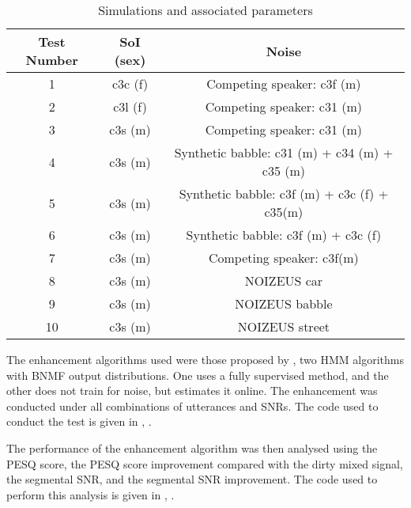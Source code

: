 \begin{table}
\protect\caption{\label{tab:test-params}Simulations and associated parameters}


\begin{centering}
\begin{tabular}{|c|c|c|}
\hline 
Test Number & \ac{SoI} (sex) & Noise\tabularnewline
\hline 
\hline 
1 & c3c (f) & Competing speaker: c3f (m)\tabularnewline
\hline 
2 & c3l (f) & Competing speaker: c31 (m)\tabularnewline
\hline 
3 & c3s (m) & Competing speaker: c31 (m)\tabularnewline
\hline 
4 & c3s (m) & Synthetic babble: c31 (m) + c34 (m) + c35 (m)\tabularnewline
\hline 
5 & c3s (m) & Synthetic babble: c3f (m) + c3c (f) + c35(m)\tabularnewline
\hline 
6 & c3s (m) & Synthetic babble: c3f (m) + c3c (f)\tabularnewline
\hline 
7 & c3s (m) & Competing speaker: c3f(m)\tabularnewline
\hline 
8 & c3s (m) & NOIZEUS car\tabularnewline
\hline 
9 & c3s (m) & NOIZEUS babble\tabularnewline
\hline 
10 & c3s (m) & NOIZEUS street\tabularnewline
\hline 
\end{tabular}
\par\end{centering}

%
%
\end{table}


The enhancement algorithms used were those proposed by \citet{mohammadiha2013supervised},
two \ac{HMM} algorithms with \ac{BNMF} output distributions. One
uses a fully supervised method, and the other does not train for noise,
but estimates it online. The enhancement was conducted under all combinations
of utterances and \acp{SNR}. The code used to conduct the test is
given in , \textit{}.

The performance of the enhancement algorithm was then analysed using
the \ac{PESQ} score, the \ac{PESQ} score improvement compared with
the dirty mixed signal, the segmental \ac{SNR}, and the segmental
\ac{SNR} improvement. The code used to perform this analysis is given
in , \textit{}.%

